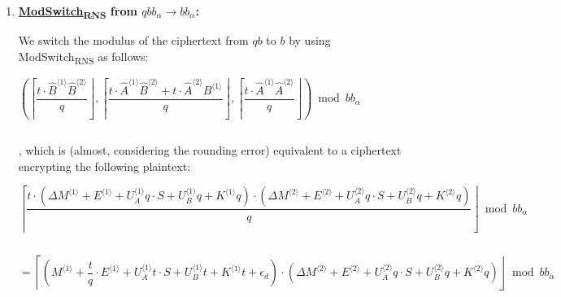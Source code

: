 \begin{enumerate}



\item \textbf{\underline{\textsf{ModSwitch\textsubscript{RNS}}} from $qbb_\alpha \rightarrow bb_\alpha$:}

We switch the modulus of the ciphertext from $qb$ to $b$ by using  \textsf{ModSwitch\textsubscript{RNS}} as follows:





$\left(\left\lceil\dfrac{t\cdot\hat{B}^{\langle 1 \rangle}\hat{B}^{\langle 2 \rangle}}{q}\right\rfloor, \left\lceil\dfrac{t\cdot\hat{A}^{\langle 1 \rangle}\hat{B}^{\langle 2 \rangle} + t\cdot\hat{A}^{\langle 2 \rangle}B^{\langle 1 \rangle}}{q}\right\rfloor, \left\lceil\dfrac{t\cdot\hat{A}^{\langle 1 \rangle}\hat{A}^{\langle 2 \rangle}}{q}\right\rfloor\right) \bmod bb_\alpha$

$ $

, which is (almost, considering the rounding error) equivalent to a ciphertext encrypting the following plaintext:

$ \left\lceil\dfrac{t\cdot(\Delta M^{\langle 1 \rangle} + E^{\langle 1 \rangle} + U_A^{\langle 1 \rangle}q \cdot S + U_B^{\langle 1 \rangle}q  + K^{\langle 1 \rangle} q)\cdot(\Delta M^{\langle 2 \rangle} + E^{\langle 2 \rangle} + U_A^{\langle 2 \rangle}q \cdot S + U_B^{\langle 2 \rangle}q  + K^{\langle 2 \rangle} q)}{q}\right\rfloor \bmod bb_\alpha$

$ $

$= \left\lceil (M^{\langle 1 \rangle} + \dfrac{t}{q}\cdot E^{\langle 1 \rangle} + U_A^{\langle 1 \rangle}t \cdot S + U_B^{\langle 1 \rangle}t + K^{\langle 1 \rangle} t + \epsilon_d)\cdot(\Delta M^{\langle 2 \rangle} + E^{\langle 2 \rangle} + U_A^{\langle 2 \rangle}q \cdot S + U_B^{\langle 2 \rangle}q + K^{\langle 2 \rangle} q)\right\rfloor \bmod bb_\alpha$ 


\end{enumerate}
